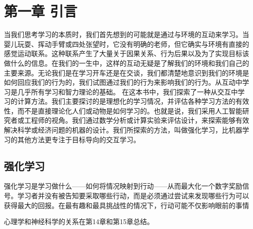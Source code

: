 
\chapter{第一章 引言}
\begin{summary}
	当我们思考学习的本质时，我们首先想到的可能就是通过与环境的互动来学习。当婴儿玩耍、挥动手臂或四处张望时，它没有明确的老师，但它确实与环境有直接的感觉运动联系。这种联系产生了大量关于因果关系、行为后果以及为了实现目标该做什么的信息。在我们的一生中，这样的互动无疑是了解我们的环境和我们自己的主要来源。无论我们是在学习开车还是在交谈，我们都清楚地意识到我们的环境是如何回应我们的行为的，我们试图通过我们的行为来影响我们的行为。从互动中学习是几乎所有学习和智力理论的基础。
	在这本书中，我们探索了一种从交互中学习的计算方法。我们主要探讨的是理想化的学习情况，并评估各种学习方法的有效性，而不是直接理论化人们或动物是如何学习的。也就是说，我们采用人工智能研究者或工程师的视角。我们通过数学分析或计算实验来评估设计，来探索能够有效解决科学或经济问题的机器的设计。我们所探索的方法，叫做强化学习，比机器学习的其他方法更专注于目标导向的交互学习。
\end{summary}

\section{强化学习}

强化学习是学习做什么——如何将情况映射到行动——从而最大化一个数字奖励信号。学习者并没有被告知要采取哪些行动，而是必须通过尝试来发现哪些行为可以获得最大的回报。在最有趣和最具挑战性的情况下，行动可能不仅影响眼前的事情

心理学和神经科学的关系在第14章和第15章总结。

